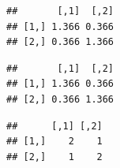 \documentclass[10pt,]{krantz}
\makeatletter
\newenvironment{Shaded}{\begin{snugshade}}{\end{snugshade}}
\newcommand{\FloatTok}[1]{\textcolor[rgb]{0.00,0.00,0.81}{#1}}
\newcommand{\StringTok}[1]{\textcolor[rgb]{0.31,0.60,0.02}{#1}}
\newcommand{\OperatorTok}[1]{\textcolor[rgb]{0.81,0.36,0.00}{\textbf{#1}}}
\newcommand{\NormalTok}[1]{#1}
\newenvironment{kframe}{%
\medskip{}
\setlength{\fboxsep}{.8em}
 \def\at@end@of@kframe{}%
 \ifinner\ifhmode%
  \def\at@end@of@kframe{\end{minipage}}%
  \begin{minipage}{\columnwidth}%
 \fi\fi%
 \def\FrameCommand##1{\hskip\@totalleftmargin \hskip-\fboxsep
 \colorbox{shadecolor}{##1}\hskip-\fboxsep
     \hskip-\linewidth \hskip-\@totalleftmargin \hskip\columnwidth}%
 \MakeFramed {\advance\hsize-\width
   \@totalleftmargin\z@ \linewidth\hsize
   \@setminipage}}%
 {\par\unskip\endMakeFramed%
 \at@end@of@kframe}
\renewenvironment{Shaded}{\begin{kframe}}{\end{kframe}}
\makeatother
\begin{document}
\begin{verbatim}
##       [,1]  [,2]
## [1,] 1.366 0.366
## [2,] 0.366 1.366
\end{verbatim}

\begin{Shaded}
\end{Shaded}

\begin{verbatim}
##       [,1]  [,2]
## [1,] 1.366 0.366
## [2,] 0.366 1.366
\end{verbatim}

\begin{Shaded}
\end{Shaded}

\begin{verbatim}
##      [,1] [,2]
## [1,]    2    1
## [2,]    1    2
\end{verbatim}
\end{document}
